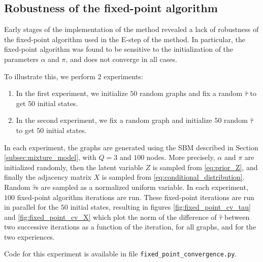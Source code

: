 \documentclass[switch, 12pt]{article}
\begin{document}
\begin{multicols}{2}
    \subsection{Robustness of the fixed-point algorithm}
    \label{subsec:robustness}

    Early stages of the implementation of the method revealed a lack of robustness of the fixed-point algorithm used in the E-step of the method. In particular, the fixed-point algorithm was found to be sensitive to the initialization of the parameters $\alpha$ and $\pi$, and does not converge in all cases.

    To illustrate this, we perform 2 experiments:
    \begin{enumerate}
        \item In the first experiment, we initialize $50$ random graphs and fix a random $\hat{\tau}$ to get $50$ initial states.
        \item In the second experiment, we fix a random graph and initialize $50$ random $\hat{\tau}$ to get $50$ initial states.
    \end{enumerate}
    In each experiment, the graphs are generated using the SBM described in Section \ref{subsec:mixture_model}, with $Q=3$ and $100$ nodes. More precisely, $\alpha$ and $\pi$ are initialized randomly, then the latent variable $Z$ is sampled from \eqref{eq:prior_Z}, and finally the adjacency matrix $X$ is sampled from \eqref{eq:conditional_distribution}. Random $\hat{\tau}$s are sampled as a normalized uniform variable.
    In each experiment, $100$ fixed-point algorithm iterations are run. These fixed-point iterations are run in parallel for the $50$ initial states, resulting in figures \ref{fig:fixed_point_cv_tau} and \ref{fig:fixed_point_cv_X} which plot the norm of the difference of $\hat{\tau}$ between two successive iterations as a function of the iteration, for all graphs, and for the two experiences.

    Code for this experiment is available in file \texttt{fixed\_point\_convergence.py}.



\end{multicols}
\end{document}
